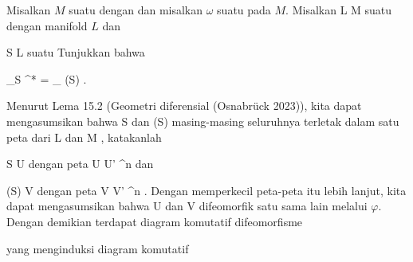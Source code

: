 {

Misalkan $M$ suatu
dengan
dan misalkan $\omega$ suatu
pada $M$. Misalkan
\maabbdisp {\varphi} { L } { M
} {}
suatu
dengan manifold $L$ dan

\mavergleichskette
{\vergleichskette
{ S
}
{ \subseteq }{ L
}
{  }{
}
{    }{
}
{   }{
}
}
{}{}{}
suatu
Tunjukkan bahwa

\mavergleichskettedisp
{\vergleichskette
{ \int_S \varphi^* \omega
}
{ =} { \int_{ \varphi(S)} \omega
}
{ } {
}
{ } {
}
{ } {
}
}
{}{}{.}

}
{

Menurut
Lema 15.2 (Geometri diferensial (Osnabrück 2023)),
kita dapat mengasumsikan bahwa
\mathkor {} {S} {dan} {\varphi(S)} {}
masing-masing seluruhnya terletak dalam satu peta dari
\mathkor {} {L} {dan} {M} {},
katakanlah

\mavergleichskette
{\vergleichskette
{ S
}
{ \subseteq }{ U
}
{  }{
}
{    }{
}
{   }{
}
}
{}{}{}
dengan peta
\maabbdisp {\alpha} { U } { U' \subseteq \R^n
} {}
dan

\mavergleichskette
{\vergleichskette
{ \varphi(S)
}
{ \subseteq }{ V
}
{  }{
}
{    }{
}
{   }{
}
}
{}{}{}
dengan peta
\maabbdisp {\beta} { V } { V' \subseteq \R^n
} {.}
Dengan memperkecil peta-peta itu lebih lanjut, kita dapat mengasumsikan bahwa
\mathkor {} {U} {dan} {V} {}
difeomorfik satu sama lain melalui $\varphi$. Dengan demikian terdapat diagram komutatif difeomorfisme

 {  }

yang menginduksi diagram komutatif

 {  }

}
